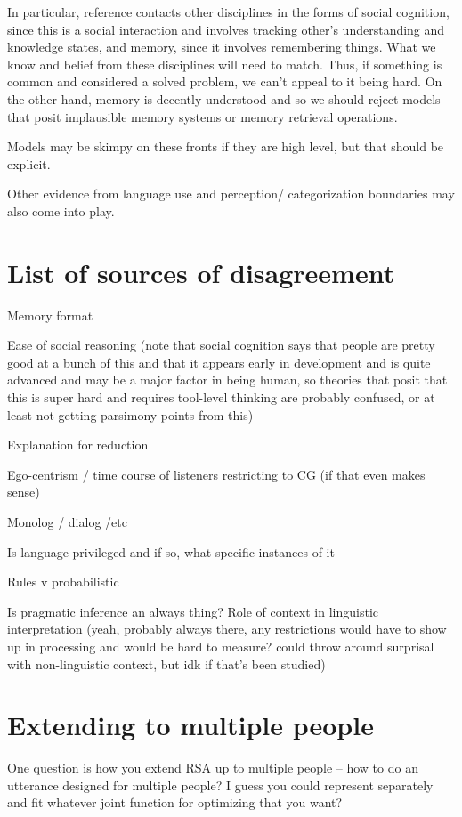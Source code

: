 \documentclass[]{article}
\begin{document}
In particular, reference contacts other disciplines in the forms of social cognition, since this is a social interaction and involves tracking other's understanding and knowledge states, and memory, since it involves remembering things. What we know and belief from these disciplines will need to match. Thus, if something is common and considered a solved problem, we can't appeal to it being hard. On the other hand, memory is decently understood and so we should reject models that posit implausible memory systems or memory retrieval operations. 

Models may be skimpy on these fronts if they are high level, but that should be explicit. 

Other evidence from language use and perception/ categorization boundaries may also come into play. 

\section{List of sources of disagreement}

Memory format 

Ease of social reasoning (note that social cognition says that people are pretty good at a bunch of this and that it appears early in development and is quite advanced and may be a major factor in being human, so theories that posit that this is super hard and requires tool-level thinking are probably confused, or at least not getting parsimony points from this)

Explanation for reduction

Ego-centrism / time course of listeners restricting to CG (if that even makes sense)

Monolog / dialog /etc 

Is language privileged and if so, what specific instances of it

Rules v probabilistic

Is pragmatic inference an always thing? Role of context in linguistic interpretation (yeah, probably always there, any restrictions would have to show up in processing and would be hard to measure? could throw around surprisal with non-linguistic context, but idk if that's been studied) 




\section{Extending to multiple people}
One question is how you extend RSA up to multiple people -- how to do an utterance designed for multiple people? I guess you could represent separately and fit whatever joint function for optimizing that you want? 
\end{document}
